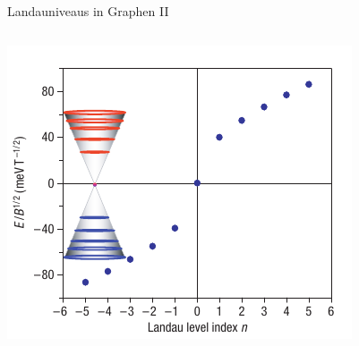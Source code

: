 \documentclass[../defence.tex]{subfiles}
\begin{document}
  \begin{frame}{Landauniveaus in Graphen II}
    \begin{columns}[onlytextwidth, T]
        \includegraphics[width=\linewidth]{images/landau_dirac.pdf}
        \cite{li2007}
    \end{columns}
    \note{
    }
  \end{frame}
\end{document}
